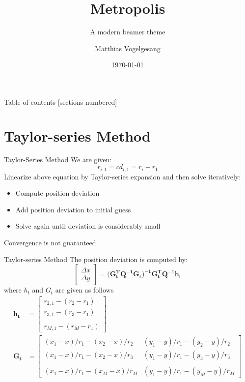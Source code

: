 \documentclass[10pt]{beamer}
\title{Metropolis}
\subtitle{A modern beamer theme}
\date{\today}
\author{Matthias Vogelgesang}
\institute{Center for modern beamer themes}
\begin{document}
\maketitle

\begin{frame}{Table of contents}
  [sections numbered]
  \tableofcontents[hideallsubsections]
\end{frame}
\section{Taylor-series Method}

\begin{frame}{Taylor-Series Method}
	We are given:
  $$ r_{i,1}=cd_{i,1}=r_{i}-r_{1} $$
  Linearize above equation by Taylor-series expansion and then solve iteratively:
	\begin{itemize}
    \item Compute position deviation
    \item Add position deviation to initial guess
    \item Solve again until deviation is considerably small
  \end{itemize}
  \alert{Convergence is not guaranteed}
\end{frame}


\begin{frame}{Taylor-series Method}
	The position deviation is computed by:
   $$\begin{bmatrix} \Delta x \\ \Delta y \end{bmatrix} = (\mathbf{G_{t}^T Q^{-1} G_{t})^{-1} G_{t}^T Q^{-1} h_{t}}$$
  where $h_{t}$ and $G_{t}$ are given as follows
 \begin{align}
    \mathbf{h_{t}} &= \begin{bmatrix} r_{2,1} - (r_{2}-r_{1}) \\  r_{3,1} - (r_{3}-r_{1})\\  \quad\\  r_{M,1} - (r_{M}-r_{1}) \end{bmatrix}  \\
    \mathbf{G_{t}} &= \begin{bmatrix} (x_{1}-x)/r_{1} - (x_{2}-x)/r_{2} & (y_{1}-y)/r_{1} - (y_{2}-y)/r_{2} \\ (x_{1}-x)/r_{1} - (x_{2}-x)/r_{3} & (y_{1}-y)/r_{1} - (y_{3}-y)/r_{3}\\  \quad\\ (x_{1}-x)/r_{1} - (x_{M}-x)/r_{M} & (y_{1}-y)/r_{1} - (y_{M}-y)/r_{M} \end{bmatrix}
  \end{align}

\end{frame}
\end{document}
